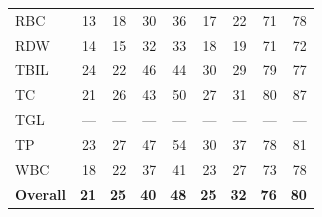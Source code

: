 \begin{table}[ht]
\begin{tabular}{lrrrrrrrr}
RBC & 13 & 18 & 30 & 36 & 17 & 22 & 71 & 78 \\
RDW & 14 & 15 & 32 & 33 & 18 & 19 & 71 & 72 \\
TBIL & 24 & 22 & 46 & 44 & 30 & 29 & 79 & 77 \\
TC & 21 & 26 & 43 & 50 & 27 & 31 & 80 & 87 \\
TGL & --- & --- & --- & --- & --- & --- & --- & --- \\
TP & 23 & 27 & 47 & 54 & 30 & 37 & 78 & 81 \\
WBC & 18 & 22 & 37 & 41 & 23 & 27 & 73 & 78 \\
\midrule
\textbf{Overall} & \textbf{21} & \textbf{25} & \textbf{40} & \textbf{48} & \textbf{25} & \textbf{32} & \textbf{76} & \textbf{80} \\
\bottomrule
\end{tabular}
\label{tab:chs_eval_interpret}
\end{table}